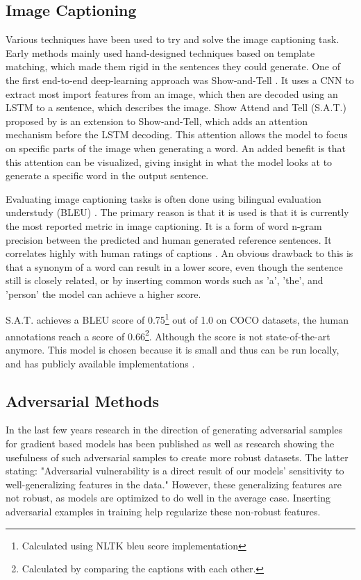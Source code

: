 \subsection*{Image Captioning}
Various techniques have been used to try and solve the image captioning task. Early methods mainly used hand-designed techniques based on template matching, which made them rigid in the sentences they could generate. One of the first end-to-end deep-learning approach was Show-and-Tell \cite{showandtell}. It uses a CNN to extract most import features from an image, which then are decoded using an LSTM \cite{lstm} to a sentence, which describes the image.
Show Attend and Tell (S.A.T.) proposed by \citeauthor{xu2016show} is an extension to Show-and-Tell, which adds an attention mechanism before the LSTM decoding. This attention allows the model to focus on specific parts of the image when generating a word. An added benefit is that this attention can be visualized, giving insight in what the model looks at to generate a specific word in the output sentence.

Evaluating image captioning tasks is often done using bilingual evaluation understudy (BLEU) \cite{papineni_roukos_ward_zhu_2001}. The primary reason is that it is used is that it is currently the most reported metric in image captioning. It is a form of word n-gram precision between the predicted and human generated reference sentences. It correlates highly with human ratings of captions \cite{showandtell}. An obvious drawback to this is that a synonym of a word can result in a lower score, even though the sentence still is closely related, or by inserting common words such as 'a', 'the', and 'person' the model can achieve a higher score.

S.A.T. achieves a BLEU score of 0.75\footnote[1]{Calculated using NLTK\cite{nltk} bleu score implementation} out of 1.0 on COCO\cite{lin2015microsoft} datasets, the human annotations reach a score of 0.66\footnote[2]{Calculated by comparing the captions with each other.}. Although the score is not state-of-the-art\cite{DBLP:journals/corr/abs-2107-06912} anymore. This model is chosen because it is small and thus can be run locally, and has publicly available implementations \cite{sgrvinod}.

\subsection*{Adversarial Methods}
In the last few years research in the direction of generating adversarial samples for gradient based models has been published \cite{goodfellow2015explaining,Kurakin} as well as research showing the usefulness of such adversarial samples\cite{Ilyas2019features} to create more robust datasets. The latter stating: "Adversarial vulnerability is a direct result of our models' sensitivity to well-generalizing features in the data." However, these generalizing features are not robust, as models are optimized to do well in the average case. Inserting adversarial examples in training help regularize these non-robust features\cite{https://doi.org/10.48550/arxiv.1611.01236}.

